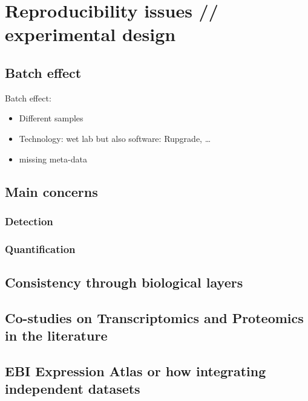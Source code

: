 


\section{Reproducibility issues // experimental design}\label{sec:expDesign}
    \subsection{Batch effect}\label{sub:BatchEffect}
    Batch effect: 

    \begin{itemize}
            \item{Different samples}
            \item{Technology: wet lab but also software: Rupgrade, \ldots}
            \item{missing meta-data}
        \end{itemize}
    \subsection{Main concerns}
        \subsubsection{Detection}
        \subsubsection{Quantification}
    \subsection{Consistency through biological layers}

\subsection{Co-studies on Transcriptomics and Proteomics in the literature}
\subsection{EBI Expression Atlas or how integrating independent datasets }





